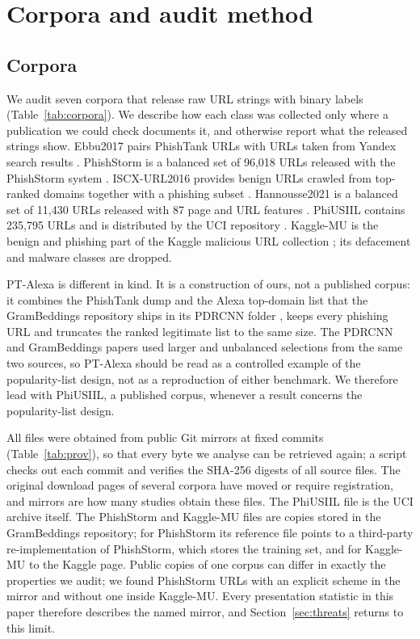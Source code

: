 \section{Corpora and audit method}
\label{sec:method}

\subsection{Corpora}
\label{sec:corpora}
We audit seven corpora that release raw URL strings with binary labels (Table~\ref{tab:corpora}). We describe how each class was collected only where a publication we could check documents it, and otherwise report what the released strings show. Ebbu2017 pairs PhishTank URLs with URLs taken from Yandex search results \citep{sahingoz2019,rashid2024}. PhishStorm is a balanced set of 96,018 URLs released with the PhishStorm system \citep{marchal2014}. ISCX-URL2016 provides benign URLs crawled from top-ranked domains together with a phishing subset \citep{mamun2016,rashid2024}. Hannousse2021 is a balanced set of 11,430 URLs released with 87 page and URL features \citep{hannousse2021}. PhiUSIIL contains 235,795 URLs and is distributed by the UCI repository \citep{prasad2024}. Kaggle-MU is the benign and phishing part of the Kaggle malicious URL collection \citep{siddhartha2021}; its defacement and malware classes are dropped.

PT-Alexa is different in kind. It is a construction of ours, not a published corpus: it combines the PhishTank dump and the Alexa top-domain list that the GramBeddings repository ships in its PDRCNN folder \citep{bozkir2023,wang2019pdrcnn}, keeps every phishing URL and truncates the ranked legitimate list to the same size. The PDRCNN and GramBeddings papers used larger and unbalanced selections from the same two sources, so PT-Alexa should be read as a controlled example of the popularity-list design, not as a reproduction of either benchmark. We therefore lead with PhiUSIIL, a published corpus, whenever a result concerns the popularity-list design.

All files were obtained from public Git mirrors at fixed commits (Table~\ref{tab:prov}), so that every byte we analyse can be retrieved again; a script checks out each commit and verifies the SHA-256 digests of all \NSourceFiles{} source files. The original download pages of several corpora have moved or require registration, and mirrors are how many studies obtain these files. The PhiUSIIL file is the UCI archive itself. The PhishStorm and Kaggle-MU files are copies stored in the GramBeddings repository; for PhishStorm its reference file points to a third-party re-implementation of PhishStorm, which stores the training set, and for Kaggle-MU to the Kaggle page. Public copies of one corpus can differ in exactly the properties we audit; we found PhishStorm URLs with an explicit scheme in the mirror and without one inside Kaggle-MU. Every presentation statistic in this paper therefore describes the named mirror, and Section~\ref{sec:threats} returns to this limit.

